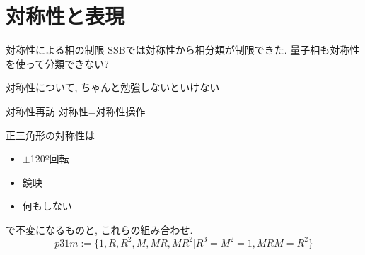 \documentclass[dvipdfm]{beamer}
\begin{document}
\section{対称性と表現}

\begin{frame}{対称性による相の制限}
    SSBでは対称性から相分類が制限できた.
    量子相も対称性を使って分類できない?

    対称性について, ちゃんと勉強しないといけない
\end{frame}

\begin{frame}{対称性再訪}
    対称性=対称性操作
    \begin{figure}
        \centering
        \begin{minipage}{0.45\linewidth}
            \centering
        \end{minipage}
        \begin{minipage}{0.45\linewidth}
            \centering
        \end{minipage}
    \end{figure}
    正三角形の対称性は
    \begin{itemize}
        \item $\pm$120º回転
        \item 鏡映
        \item 何もしない
    \end{itemize}
    で不変になるものと, これらの組み合わせ.
    \begin{equation*}
        p31m:=\{1, R, R^2, M, MR, MR^2 | R^3=M^2=1, MRM=R^2\}
    \end{equation*}
\end{frame}
\end{document}
